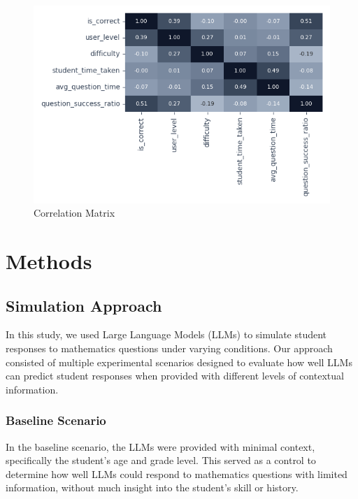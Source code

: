 \documentclass[
    a4paper, %
    10pt, %
    twoside, %
]{LTJournalArticle}
\begin{document}
\begin{figure}[H]
    \centering
    \includegraphics[width=\columnwidth]{images/correlation_matrix.png}
    \caption{Correlation Matrix}
    \label{fig:correlation-matrix}
\end{figure}



\section{Methods}

\subsection{Simulation Approach}
In this study, we used Large Language Models (LLMs) to simulate student responses to mathematics questions under varying conditions. Our approach consisted of multiple experimental scenarios designed to evaluate how well LLMs can predict student responses when provided with different levels of contextual information.

\subsubsection{Baseline Scenario}
In the baseline scenario, the LLMs were provided with minimal context, specifically the student's age and grade level. This served as a control to determine how well LLMs could respond to mathematics questions with limited information, without much insight into the student's skill or history.
\end{document}

